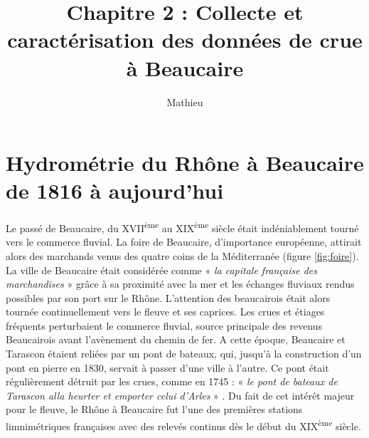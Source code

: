 \documentclass[11pt]{article}
\title{Chapitre 2 : Collecte et caractérisation des données de crue à Beaucaire}
\author{Mathieu}
\begin{document}
\maketitle


\tableofcontents


\newpage 


\section{Hydrométrie du Rhône à Beaucaire de 1816 à aujourd'hui}
\label{sec:hydrometrie}

\paragraph{} Le passé de Beaucaire, du XVII\textsuperscript{ème} au XIX\textsuperscript{ème} siècle était indéniablement tourné vers le commerce fluvial. La foire de Beaucaire, d'importance européenne, attirait alors des marchands venus des quatre coins de la Méditerranée (figure \ref{fig:foire}). La ville de Beaucaire était considérée comme « \textit{la capitale française des marchandises} » \citep{leon_vie_1953} grâce à sa proximité avec la mer et les échanges fluviaux rendus possibles par son port sur le Rhône. L'attention des beaucairois était alors tournée continuellement vers le fleuve et ses caprices. Les crues et étiages fréquents perturbaient le commerce fluvial, source principale des revenus Beaucairois avant l'avènement du chemin de fer. A cette époque, Beaucaire et Tarascon étaient reliées par un pont de bateaux, qui, jusqu'à la construction d'un pont en pierre en 1830, servait à passer d'une ville à l'autre. Ce pont était régulièrement détruit par les crues, comme en 1745 : « \textit{le pont de bateaux de Tarascon alla heurter et emporter celui d'Arles} » \citep{anibert_annales_1764}. Du fait de cet intérêt majeur pour le fleuve, le Rhône à Beaucaire fut l'une des premières stations limnimétriques françaises avec des relevés continus dès le début du XIX\textsuperscript{ème} siècle. 
\end{document}
